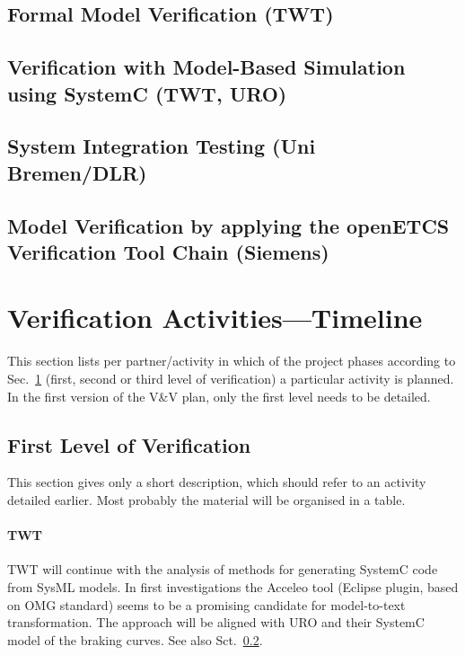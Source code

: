 

\subsection{Formal Model Verification (TWT)}
\label{sec:real-time-TA-openETCS}




\subsection{Verification with Model-Based Simulation using SystemC (TWT, URO)}
\label{sec:model-based-sim-openETCS}



\subsection{System Integration  Testing (Uni Bremen/DLR)}



\subsection{Model Verification by applying the openETCS
  Verification Tool Chain (Siemens)}



\section{Verification Activities---Timeline}
\label{sec:verif-activ-timel}

This section lists per partner/activity in which of the project
phases according to Sec.~\ref{sec:verif-activ-timel} (first, second or
third level of verification) a particular activity is planned. In the
first version of the V\&V plan, only the first level needs to be detailed.


\subsection{First Level of Verification}
\label{sec:first-level-verif}

This section gives only a short description, which should refer to an
activity detailed earlier. Most probably the material will be
organised in a table.

\paragraph{TWT}
TWT will continue with the analysis of methods for generating SystemC
code from SysML models. In first investigations the Acceleo tool
(Eclipse plugin, based on OMG standard) seems to be a promising
candidate for model-to-text transformation. The approach will be
aligned with URO and their SystemC model of the braking curves.  See
also Sct.~\ref{sec:model-based-sim-openETCS}.

